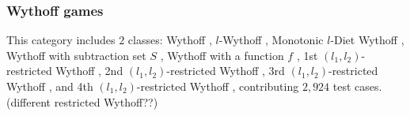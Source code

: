 \documentclass[review]{elsarticle}
\begin{document}
\subsubsection{Wythoff games}
This category includes $2$ classes: Wythoff \cite{Wyt1907}, $l$-Wythoff \cite{Fra1982}, Monotonic $l$-Diet Wythoff \cite{AhnCCEFGGKMPS2017}, Wythoff with subtraction set $S$ \cite{DucFGN2009}, Wythoff with a function $f$ \cite{LiuZ2015}, 1st $(l_1, l_2)$-restricted Wythoff \cite{FraH2014}, 2nd $(l_1, l_2)$-restricted Wythoff \cite{Gur2012}, 3rd $(l_1, l_2)$-restricted Wythoff \cite{LiuL2014}, and 4th $(l_1, l_2)$-restricted Wythoff \cite{EriS2009}, contributing $2,924$ test cases. (different restricted Wythoff??)

\end{document}
